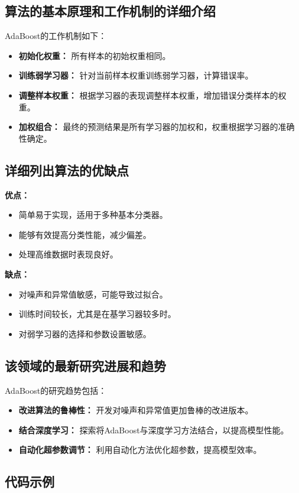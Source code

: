 \subsection*{算法的基本原理和工作机制的详细介绍}
AdaBoost的工作机制如下：
\begin{itemize}
    \item \textbf{初始化权重：} 所有样本的初始权重相同。
    \item \textbf{训练弱学习器：} 针对当前样本权重训练弱学习器，计算错误率。
    \item \textbf{调整样本权重：} 根据学习器的表现调整样本权重，增加错误分类样本的权重。
    \item \textbf{加权组合：} 最终的预测结果是所有学习器的加权和，权重根据学习器的准确性确定。
\end{itemize}

\subsection*{详细列出算法的优缺点}
\textbf{优点：}
\begin{itemize}
    \item 简单易于实现，适用于多种基本分类器。
    \item 能够有效提高分类性能，减少偏差。
    \item 处理高维数据时表现良好。
\end{itemize}

\textbf{缺点：}
\begin{itemize}
    \item 对噪声和异常值敏感，可能导致过拟合。
    \item 训练时间较长，尤其是在基学习器较多时。
    \item 对弱学习器的选择和参数设置敏感。
\end{itemize}

\subsection*{该领域的最新研究进展和趋势}
AdaBoost的研究趋势包括：
\begin{itemize}
    \item \textbf{改进算法的鲁棒性：} 开发对噪声和异常值更加鲁棒的改进版本。
    \item \textbf{结合深度学习：} 探索将AdaBoost与深度学习方法结合，以提高模型性能。
    \item \textbf{自动化超参数调节：} 利用自动化方法优化超参数，提高模型效率。
\end{itemize}
\subsection*{代码示例}
\begin{lstlisting}

\end{lstlisting}


